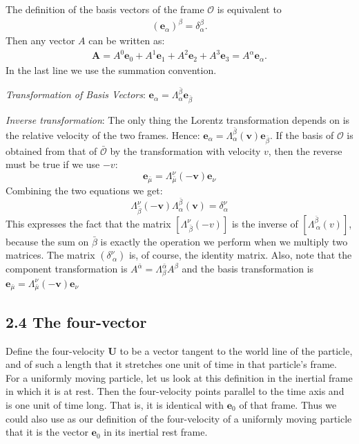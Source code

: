 \documentclass[12pt]{book}
\newcommand{\bm}[1]{\boldsymbol{#1}}
\begin{document}
        The definition of the basis vectors of the frame \( \mathcal{O} \) is equivalent to
        \begin{align}
        (\mathbf{e}_\alpha)^\beta = \delta_\alpha^\beta.
        \end{align}
        Then any vector \(A\) can be written as:
        \begin{align}
        \mathbf{A}= A^0 \mathbf{e}_0 + A^1 \mathbf{e}_1 + A^2 \mathbf{e}_2 + A^3 \mathbf{e}_3 = A^\alpha \mathbf{e}_\alpha.
        \end{align}
        In the last line we use the summation convention.
    
        \textit{Transformation of Basis Vectors}: \quad \( \mathbf{e}_\alpha=\Lambda^{\bar{\beta}}_\alpha \mathbf{e}_{\bar{\beta}}\)

        \textit{Inverse transformation}: The only thing the Lorentz transformation depends on is the relative velocity of the two frames. Hence: \(    \mathbf{e}_\alpha=\Lambda^{\bar{\beta}}_\alpha(\bm{v}) \mathbf{e}_{\bar{\beta}}\). If the basis of \(\mathcal{O}\) is obtained from that of \(\mathcal{\bar{O}}\) by the transformation with velocity \(v\), then the reverse must be true if we use \(-v\):
        \[
            \mathbf{e}_{\bar{\mu}}=\Lambda^{\nu}_{\bar{\mu}}(\bm{-v}) \mathbf{e}_{\nu}
        \]
        Combining the two equations we get:
        \[
            \Lambda^{\nu}_{\bar{\beta}} (\bm{-v}) \Lambda^{\bar{\beta}}_{\alpha} (\bm{v}) = \delta^{\nu}_{\alpha}
        \]
        This expresses the fact that the matrix \([\Lambda^\nu_{\ \bar{\beta}}(-v)]\) is the inverse of \([\Lambda^{\bar{\beta}}_{\ \alpha}(v)]\), because the sum on \(\bar{\beta}\) is exactly the operation we perform when we multiply two matrices. The matrix \((\delta^{\nu}_{\ \alpha})\) is, of course, the identity matrix. Also, note that the component transformation is \(A^{\bar{\alpha}}=\Lambda^{\bar{\alpha}}_{\beta} A^{\beta}\) and the basis transformation is \(\mathbf{e}{_{\bar{\mu}}}=\Lambda^{\nu}_{\bar{\mu}}(\bm{-v}) \mathbf{e}_{\nu}\)

    \subsection{2.4 The four-vector}

        Define the four-velocity \( \mathbf{U} \) to be a vector tangent to the world line of the particle, and of such a length that it stretches one unit of time in that particle’s frame. For a uniformly moving particle, let us look at this definition in the inertial frame in which it is at rest. Then the four-velocity points parallel to the time axis and is one unit of time long. That is, it is identical with \( \mathbf{e}_0 \) of that frame. Thus we could also use as our definition of the four-velocity of a uniformly moving particle that it is the vector \( \mathbf{e}_0 \) in its inertial rest frame.
\end{document}
